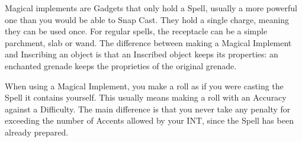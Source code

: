 Magical implements are Gadgets that only hold a Spell, usually a more powerful one than you would be able to Snap Cast. They hold a single charge, meaning they can be used once. For regular spells, the receptacle can be a simple parchment, slab or wand. The difference between making a Magical Implement and Inscribing an object is that an Inscribed object keeps its properties: an enchanted grenade keeps the proprieties of the original grenade.

When using a Magical Implement, you make a roll as if you were casting the Spell it contains yourself. This usually means making a roll with an Accuracy against a Difficulty. The main difference is that you never take any penalty for exceeding the number of Accents allowed by your INT, since the Spell has been already prepared.



